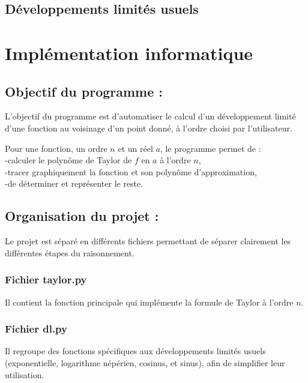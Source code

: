 \documentclass{article}
\begin{document}
\subsection{Développements limités usuels}

\section{Implémentation informatique}

\subsection{Objectif du programme :}

L’objectif du programme est d’automatiser le calcul d’un développement limité d’une fonction au voisinage d’un point donné, à l’ordre choisi par l’utilisateur. 

Pour une fonction, un ordre $n$ et un réel $a$, le programme permet de : \\
-calculer le polynôme de Taylor de $f$ en $a$ à l'ordre $n$, \\
-tracer graphiquement la fonction et son polynôme d'approximation, \\
-de déterminer et représenter le reste.\\

\subsection{Organisation du projet : }

Le projet est séparé en différents fichiers permettant de séparer clairement les différentes étapes du raisonnement. \\
\subsubsection{Fichier taylor.py}
Il contient la fonction principale qui implémente la formule de Taylor à l’ordre $n$.
\subsubsection{Fichier dl.py}
Il regroupe des fonctions spécifiques aux développements limités usuels (exponentielle, logarithme népérien, cosinus, et sinus), afin de simplifier leur utilisation.
\end{document}
